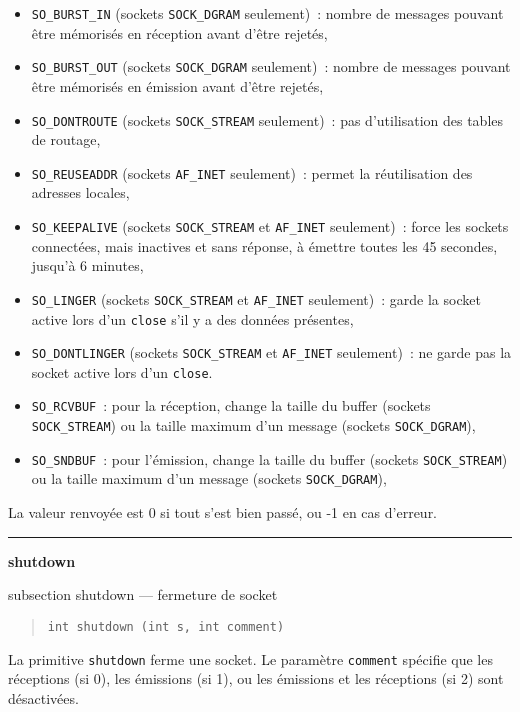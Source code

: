 \documentclass [twoside] {report}
\newcommand {\primitive} [1]
    {
	\phantomsection
	{\large \bf #1}
	\addcontentsline {toc} {subsection} {#1}
    }
\newcommand {\separation}
    {
	\vspace {5mm}
	\nopagebreak
	\hrule
    }
\begin{document}
\begin {itemize}
    \item {\tt SO\_BURST\_IN} (sockets {\tt SOCK\_DGRAM}
	seulement)~: nombre de messages pouvant être mémorisés
	en réception avant d'être rejetés,
    \item {\tt SO\_BURST\_OUT} (sockets {\tt SOCK\_DGRAM}
	seulement)~: nombre de messages pouvant être mémorisés
	en émission avant d'être rejetés,
    \item {\tt SO\_DONTROUTE} (sockets {\tt SOCK\_STREAM}
	seulement)~: pas d'utilisation des tables de
	routage,
    \item {\tt SO\_REUSEADDR} (sockets {\tt AF\_INET}
	seulement)~: permet la réutilisation des adresses
	locales,
    \item {\tt SO\_KEEPALIVE} (sockets {\tt SOCK\_STREAM} et
	{\tt AF\_INET} seulement)~: force les sockets
	connectées, mais inactives et sans réponse, à
	émettre toutes les 45 secondes, jusqu'à 6 minutes,
    \item {\tt SO\_LINGER} (sockets {\tt SOCK\_STREAM} et
	{\tt AF\_INET} seulement)~: garde la socket active
	lors d'un {\tt close} s'il y a des données présentes,
    \item {\tt SO\_DONTLINGER} (sockets {\tt SOCK\_STREAM} et
	{\tt AF\_INET} seulement)~: ne garde pas la socket active
	lors d'un {\tt close}.
    \item {\tt SO\_RCVBUF}~: pour la réception,
	change la taille du buffer
	(sockets {\tt SOCK\_STREAM}) ou la taille
	maximum d'un message (sockets {\tt SOCK\_DGRAM}),
    \item {\tt SO\_SNDBUF}~: pour l'émission,
	change la taille du buffer
	(sockets {\tt SOCK\_STREAM}) ou la taille
	maximum d'un message (sockets {\tt SOCK\_DGRAM}),
\end {itemize}

La valeur renvoyée est 0 si tout s'est bien passé, ou -1 en
cas d'erreur.



\separation
\primitive {shutdown} --- fermeture de socket

\begin {quote}
\begin {verbatim}
int shutdown (int s, int comment)
\end{verbatim}
\end {quote}

La primitive {\tt shutdown} ferme une socket. Le paramètre
{\tt comment} spécifie que les réceptions (si 0), les
émissions (si 1), ou les émissions et les réceptions (si 2) sont
désactivées.
\end{document}
